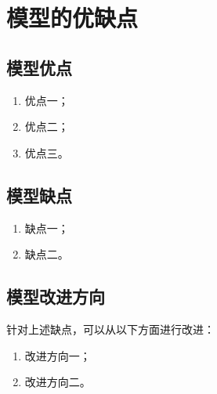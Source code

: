 
\section{模型的优缺点}

\subsection{模型优点}

\begin{enumerate}
	\item 优点一；
	\item 优点二；
	\item 优点三。
\end{enumerate}

\subsection{模型缺点}

\begin{enumerate}
	\item 缺点一；
	\item 缺点二。
\end{enumerate}

\subsection{模型改进方向}

针对上述缺点，可以从以下方面进行改进：

\begin{enumerate}
	\item 改进方向一；
	\item 改进方向二。
\end{enumerate}
